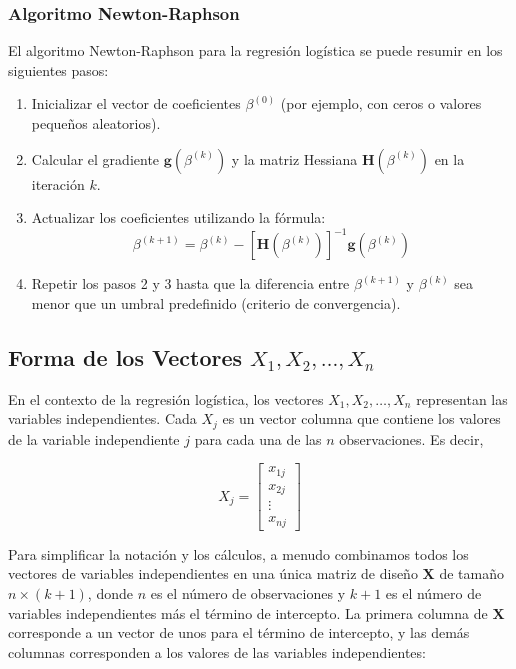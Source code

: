 \subsubsection*{Algoritmo Newton-Raphson}

El algoritmo Newton-Raphson para la regresión logística se puede resumir en los siguientes pasos:
\begin{Algthm}
\begin{enumerate}
    \item Inicializar el vector de coeficientes $\beta^{(0)}$ (por ejemplo, con ceros o valores pequeños aleatorios).
    \item Calcular el gradiente $\mathbf{g}(\beta^{(k)})$ y la matriz Hessiana $\mathbf{H}(\beta^{(k)})$ en la iteración $k$.
    \item Actualizar los coeficientes utilizando la fórmula:
    \begin{equation}
    \beta^{(k+1)} = \beta^{(k)} - \left[ \mathbf{H}(\beta^{(k)}) \right]^{-1} \mathbf{g}(\beta^{(k)})
    \end{equation}
    \item Repetir los pasos 2 y 3 hasta que la diferencia entre $\beta^{(k+1)}$ y $\beta^{(k)}$ sea menor que un umbral predefinido (criterio de convergencia).
\end{enumerate}
\end{Algthm}

\subsection{Forma de los Vectores $X_1, X_2, \ldots, X_n$}

En el contexto de la regresión logística, los vectores $X_1, X_2, \ldots, X_n$ representan las variables independientes. Cada $X_j$ es un vector columna que contiene los valores de la variable independiente $j$ para cada una de las $n$ observaciones. Es decir,

\begin{equation}
X_j = \begin{bmatrix}
x_{1j} \\
x_{2j} \\
\vdots \\
x_{nj}
\end{bmatrix}
\end{equation}

Para simplificar la notación y los cálculos, a menudo combinamos todos los vectores de variables independientes en una única matriz de diseño $\mathbf{X}$ de tamaño $n \times (k+1)$, donde $n$ es el número de observaciones y $k+1$ es el número de variables independientes más el término de intercepto. La primera columna de $\mathbf{X}$ corresponde a un vector de unos para el término de intercepto, y las demás columnas corresponden a los valores de las variables independientes:

